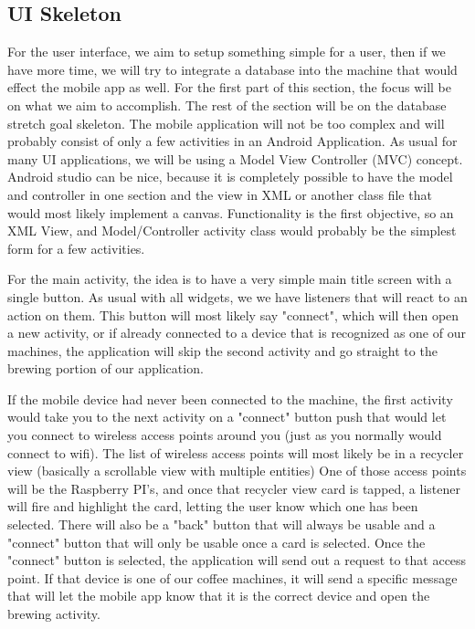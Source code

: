 \documentclass[conference]{IEEEtran}
\begin{document}
\subsection{UI Skeleton}
For the user interface, we aim to setup something simple for a user, then if we
have more time, we will try to integrate a database into the machine that would
effect the mobile app as well. For the first part of this section, the focus will be
on what we aim to accomplish. The rest of the section will be on the database
stretch goal skeleton. The mobile application will not be too complex and will
probably consist of only a few activities in an Android Application. As usual
for many UI applications, we will be using a Model View Controller (MVC)      %
concept.  Android studio can be nice, because it is completely possible to have
the model and controller in one section and the view in XML or another class
file that would most likely implement a canvas. Functionality is the first
objective, so an XML View, and Model/Controller activity class would probably
be the simplest form for a few activities.

For the main activity, the idea is to have a very simple main title screen
with a single button. As usual with all widgets, we we have listeners that will
react to an action on them. This button will most likely say "connect", which
will then open a new activity, or if already connected to a device that is
recognized as one of our machines, the application will skip the second
activity and go straight to the brewing portion of our application. 

If the mobile device had never been connected to the machine, the first
activity would take you to the next activity on a "connect" button push that
would let you connect to wireless access points around you (just as you
normally would connect to wifi). The list of wireless access points will most
likely be in a recycler view (basically a scrollable view with multiple
entities) One of those access points will be the Raspberry PI's, and once that
recycler view card is tapped, a listener will fire and highlight the card,
letting the user know which one has been selected. There will also be a "back"
button that will always be usable and a "connect" button that will only be
usable once a card is selected. Once the "connect" button is selected, the
application will send out a request to that access point. If that device is one
of our coffee machines, it will send a specific message that will let the
mobile app know that it is the correct device and open the brewing activity.
\par %
\end{document}
